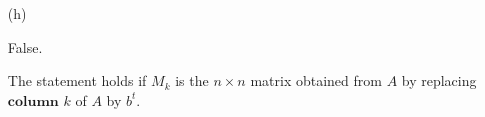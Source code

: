 \begin{Exercise}
\begin{enumerate}[(a)]
\item[(h)]
\begin{answer}
False.
\end{answer}
\begin{solution}
The statement holds if $M_k$ is the $n\times n$ matrix obtained from $A$ by replacing $\mathbf{column}$ $k$ of $A$ by $b^t$.
\end{solution}

\end{enumerate}
\end{Exercise}